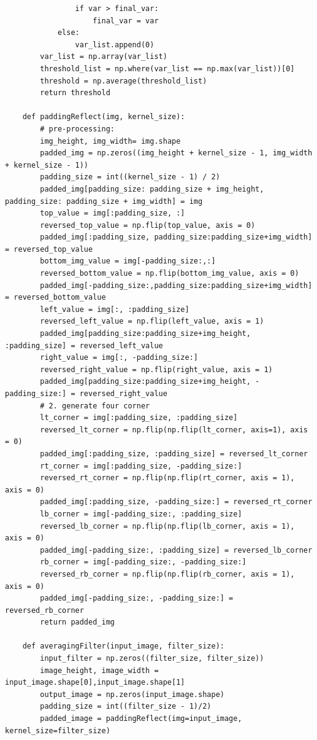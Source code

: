 \documentclass[12pt]{article}
\begin{document}
\begin{enumerate}[leftmargin=\labelsep]
\begin{enumerate}
\begin{lstlisting}
                if var > final_var:
                    final_var = var
            else:
                var_list.append(0)
        var_list = np.array(var_list)
        threshold_list = np.where(var_list == np.max(var_list))[0]
        threshold = np.average(threshold_list)
        return threshold

    def paddingReflect(img, kernel_size):
        # pre-processing:
        img_height, img_width= img.shape
        padded_img = np.zeros((img_height + kernel_size - 1, img_width + kernel_size - 1))
        padding_size = int((kernel_size - 1) / 2)
        padded_img[padding_size: padding_size + img_height, padding_size: padding_size + img_width] = img
        top_value = img[:padding_size, :]
        reversed_top_value = np.flip(top_value, axis = 0)
        padded_img[:padding_size, padding_size:padding_size+img_width] = reversed_top_value
        bottom_img_value = img[-padding_size:,:]
        reversed_bottom_value = np.flip(bottom_img_value, axis = 0)
        padded_img[-padding_size:,padding_size:padding_size+img_width] = reversed_bottom_value
        left_value = img[:, :padding_size]
        reversed_left_value = np.flip(left_value, axis = 1)
        padded_img[padding_size:padding_size+img_height, :padding_size] = reversed_left_value
        right_value = img[:, -padding_size:]
        reversed_right_value = np.flip(right_value, axis = 1)
        padded_img[padding_size:padding_size+img_height, -padding_size:] = reversed_right_value
        # 2. generate four corner
        lt_corner = img[:padding_size, :padding_size]
        reversed_lt_corner = np.flip(np.flip(lt_corner, axis=1), axis = 0)
        padded_img[:padding_size, :padding_size] = reversed_lt_corner
        rt_corner = img[:padding_size, -padding_size:]
        reversed_rt_corner = np.flip(np.flip(rt_corner, axis = 1), axis = 0)
        padded_img[:padding_size, -padding_size:] = reversed_rt_corner
        lb_corner = img[-padding_size:, :padding_size]
        reversed_lb_corner = np.flip(np.flip(lb_corner, axis = 1), axis = 0)
        padded_img[-padding_size:, :padding_size] = reversed_lb_corner
        rb_corner = img[-padding_size:, -padding_size:]
        reversed_rb_corner = np.flip(np.flip(rb_corner, axis = 1), axis = 0)
        padded_img[-padding_size:, -padding_size:] = reversed_rb_corner
        return padded_img

    def averagingFilter(input_image, filter_size):
        input_filter = np.zeros((filter_size, filter_size))
        image_height, image_width = input_image.shape[0],input_image.shape[1]
        output_image = np.zeros(input_image.shape)
        padding_size = int((filter_size - 1)/2)
        padded_image = paddingReflect(img=input_image, kernel_size=filter_size)


\end{lstlisting}
\end{enumerate}
\end{enumerate}
\end{document}
